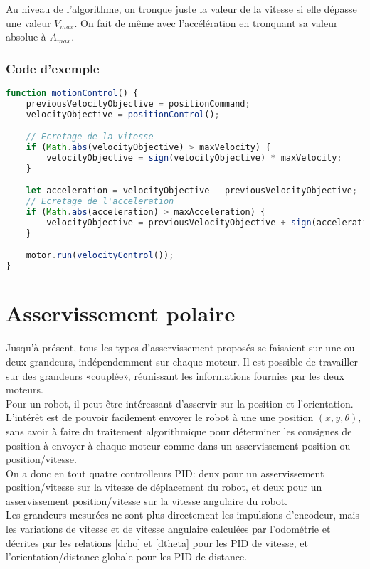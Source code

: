         \newpage

        Au niveau de l'algorithme, on tronque juste la valeur de la vitesse si elle dépasse une valeur $V_{max}$. On fait de même avec l'accélération en tronquant sa valeur absolue à $A_{max}$.
        \subsubsection{Code d'exemple}
            \begin{lstlisting}[language=JavaScript]
function motionControl() {
    previousVelocityObjective = positionCommand;
    velocityObjective = positionControl();

    // Ecretage de la vitesse
    if (Math.abs(velocityObjective) > maxVelocity) {
        velocityObjective = sign(velocityObjective) * maxVelocity;
    }

    let acceleration = velocityObjective - previousVelocityObjective;
    // Ecretage de l'acceleration
    if (Math.abs(acceleration) > maxAcceleration) {
        velocityObjective = previousVelocityObjective + sign(acceleration) * maxAcceleration;
    }

    motor.run(velocityControl());
}
            \end{lstlisting}

    \newpage
    \section{Asservissement polaire}
        Jusqu'à présent, tous les types d'asservissement proposés se faisaient sur une ou deux grandeurs, indépendemment sur chaque moteur. Il est possible de travailler sur des grandeurs «couplée», réunissant les informations fournies par les deux moteurs.\\

        Pour un robot, il peut être intéressant d'asservir sur la position et l'orientation. L'intérêt est de pouvoir facilement envoyer le robot à une une position $(x, y, \theta)$, sans avoir à faire du traitement algorithmique pour déterminer les consignes de position à envoyer à chaque moteur comme dans un asservissement position ou position/vitesse.\\
        On a donc en tout quatre controlleurs PID: deux pour un asservissement position/vitesse sur la vitesse de déplacement du robot, et deux pour un asservissement position/vitesse sur la vitesse angulaire du robot.\\
        Les grandeurs mesurées ne sont plus directement les impulsions d'encodeur, mais les variations de vitesse et de vitesse angulaire calculées par l'odométrie et décrites par les relations \eqref{drho} et \eqref{dtheta} pour les PID de vitesse, et l'orientation/distance globale pour les PID de distance.

